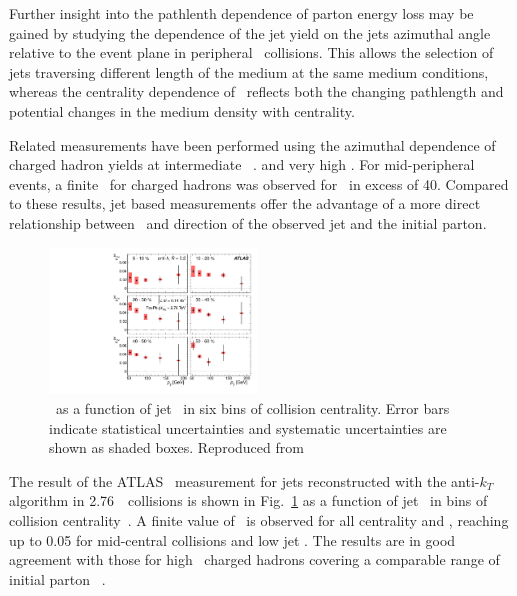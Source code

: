 Further insight into the pathlenth dependence of parton energy
loss may be gained by studying the dependence of the jet yield
on the jets azimuthal angle relative to the event plane
in peripheral \PbPb\ collisions. This allows the selection of jets
traversing different length of the medium at the same medium
conditions, whereas the centrality dependence of \Rcp\ reflects
both the changing pathlength and potential changes in the medium
density with centrality.

Related measurements have been performed using the azimuthal dependence
of charged hadron yields at intermediate \pT\
\cite{Adams:2004wz,Adler:2006bw,Adare:2010sp, ATLAS:2011ah, Abelev:2012di}.
and very high \pT \cite{Chatrchyan:2012xq}. For mid-peripheral events,
a finite \vtwo\ for charged hadrons was observed for \pT\ in excess of 40\GeVc.
Compared to these results, jet based measurements offer the advantage
of a more direct relationship between \pT\ and direction of the observed
jet and the initial parton.

\begin{figure}[!th]
\begin{center}
\includegraphics[width=0.49\textwidth]{jetfigures/ATLAS_jetv2.pdf}
\caption{\vtjet\ as a function of jet \pT\ in six bins of 
collision centrality.
Error bars indicate statistical uncertainties and 
systematic uncertainties are shown as shaded boxes. Reproduced from~\cite{Aad:2013sla}}
\label{fig:GR:ATLAS_jet_v2}
\end{center}
\end{figure}

The result of the ATLAS \vtwo\ measurement for jets reconstructed with the anti-$k_T$
algorithm in 2.76\TeV\ \PbPb\ collisions is shown in Fig.~\ref{fig:GR:ATLAS_jet_v2}
as a function of jet \pT\ in bins of collision centrality~\cite{Aad:2013sla}. A finite
value of \vtwo\ is observed for all centrality and \pT, reaching up to 0.05 for
mid-central collisions and low jet \pT. The results are in good agreement
with those for high \pT\ charged hadrons covering a comparable range
of initial parton \pT~\cite{Chatrchyan:2012xq}.

